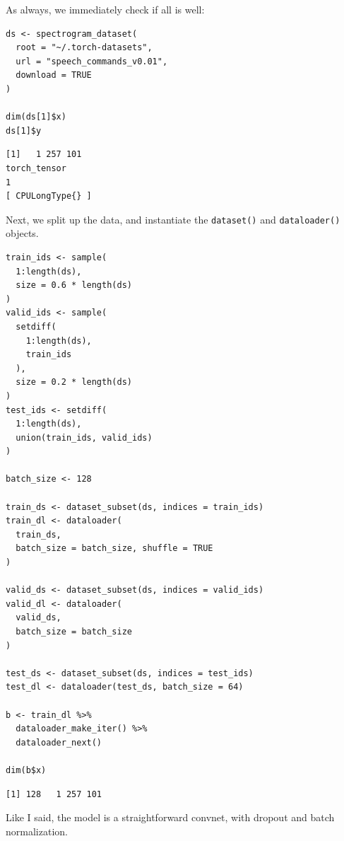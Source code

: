 \documentclass[
  letterpaper,
]{krantz}
\begin{document}
As always, we immediately check if all is well:

\begin{verbatim}
ds <- spectrogram_dataset(
  root = "~/.torch-datasets",
  url = "speech_commands_v0.01",
  download = TRUE
)

dim(ds[1]$x)
ds[1]$y
\end{verbatim}

\begin{verbatim}
[1]   1 257 101
torch_tensor
1
[ CPULongType{} ]
\end{verbatim}

Next, we split up the data, and instantiate the \texttt{dataset()} and
\texttt{dataloader()} objects.

\begin{verbatim}
train_ids <- sample(
  1:length(ds),
  size = 0.6 * length(ds)
)
valid_ids <- sample(
  setdiff(
    1:length(ds),
    train_ids
  ),
  size = 0.2 * length(ds)
)
test_ids <- setdiff(
  1:length(ds),
  union(train_ids, valid_ids)
)

batch_size <- 128

train_ds <- dataset_subset(ds, indices = train_ids)
train_dl <- dataloader(
  train_ds,
  batch_size = batch_size, shuffle = TRUE
)

valid_ds <- dataset_subset(ds, indices = valid_ids)
valid_dl <- dataloader(
  valid_ds,
  batch_size = batch_size
)

test_ds <- dataset_subset(ds, indices = test_ids)
test_dl <- dataloader(test_ds, batch_size = 64)

b <- train_dl %>%
  dataloader_make_iter() %>%
  dataloader_next()

dim(b$x)
\end{verbatim}

\begin{verbatim}
[1] 128   1 257 101
\end{verbatim}

Like I said, the model is a straightforward convnet, with dropout and
batch normalization.
\end{document}
